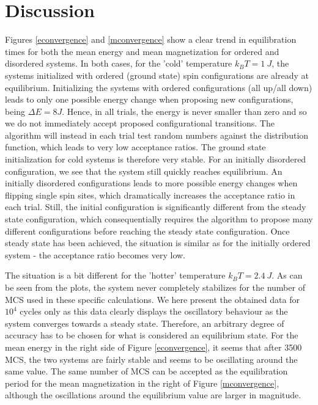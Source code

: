 \section{Discussion}
Figures \ref{econvergence} and \ref{mconvergence} show a clear trend in equilibration times for both the mean energy and mean magnetization for ordered and disordered systems. In both cases, for the 'cold' temperature $k_B T = 1\ J$, the systems initialized with ordered (ground state) spin configurations are already at equilibrium. Initializing the systems with ordered configurations (all up/all down) leads to only one possible energy change when proposing new configurations, being $\Delta E = 8J$. Hence, in all trials, the energy is never smaller than zero and so we do not immediately accept proposed configurational transitions. The algorithm will instead in each trial test random numbers against the distribution function, which leads to very low acceptance ratios. The ground state initialization for cold systems is therefore very stable. For an initially disordered configuration, we see that the system still quickly reaches equilibrium. An initially disordered configurations leads to more possible energy changes when flipping single spin sites, which dramatically increases the acceptance ratio in each trial. Still, the initial configuration is significantly different from the steady state configuration, which consequentially requires the algorithm to propose many different configurations before reaching the steady state configuration. Once steady state has been achieved, the situation is similar as for the initially ordered system - the acceptance ratio becomes very low. 

The situation is a bit different for the 'hotter' temperature $k_B T = 2.4\ J$. As can be seen from the plots, the system never completely stabilizes for the number of MCS used in these specific calculations. We here present the obtained data for $10^4$ cycles only as this data clearly displays the oscillatory behaviour as the system converges towards a steady state.  Therefore, an arbitrary degree of accuracy has to be chosen for what is considered an equilibrium state. For the mean energy in the right side of Figure \ref{econvergence}, it seems that after 3500 MCS, the two systems are fairly stable and seems to be oscillating around the same value. The same number of MCS can be accepted as the equilibration period for the mean magnetization in the right of Figure \ref{mconvergence}, although the oscillations around the equilibrium value are larger in magnitude.\\


